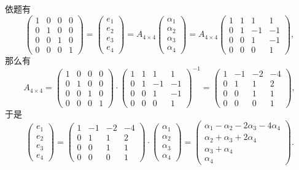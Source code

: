 依题有
$$\begin{pmatrix}1 & 0 & 0 & 0\\0 & 1 & 0 & 0\\0 & 0 & 1 & 0\\0 & 0 & 0 & 1\end{pmatrix} = \begin{pmatrix} e_1 \\ e_2 \\ e_3 \\ e_4 \end{pmatrix} = A_{4\times 4} \begin{pmatrix} \alpha_1 \\ \alpha_2 \\ \alpha_3 \\ \alpha_4 \end{pmatrix} = A_{4\times 4} \begin{pmatrix}1 & 1 & 1 & 1\\0 & 1 & -1 & -1\\0 & 0 & 1 & -1\\0 & 0 & 0 & 1\end{pmatrix},$$
那么有
$$
A_{4\times 4} = \begin{pmatrix}1 & 0 & 0 & 0\\0 & 1 & 0 & 0\\0 & 0 & 1 & 0\\0 & 0 & 0 & 1\end{pmatrix} \cdot \begin{pmatrix}1 & 1 & 1 & 1\\0 & 1 & -1 & -1\\0 & 0 & 1 & -1\\0 & 0 & 0 & 1\end{pmatrix}^{-1} = \begin{pmatrix}1 & -1 & -2 & -4\\0 & 1 & 1 & 2\\0 & 0 & 1 & 1\\0 & 0 & 0 & 1\end{pmatrix},
$$
于是
$$\begin{pmatrix} e_1 \\ e_2 \\ e_3 \\ e_4 \end{pmatrix} = \begin{pmatrix}1 & -1 & -2 & -4\\0 & 1 & 1 & 2\\0 & 0 & 1 & 1\\0 & 0 & 0 & 1\end{pmatrix} \cdot \begin{pmatrix} \alpha_1 \\ \alpha_2 \\ \alpha_3 \\ \alpha_4 \end{pmatrix} = \begin{pmatrix} \alpha_1-\alpha_2-2\alpha_3-4\alpha_4 \\ \alpha_2+\alpha_3+2\alpha_4 \\ \alpha_3+\alpha_4 \\ \alpha_4 \end{pmatrix}.$$

